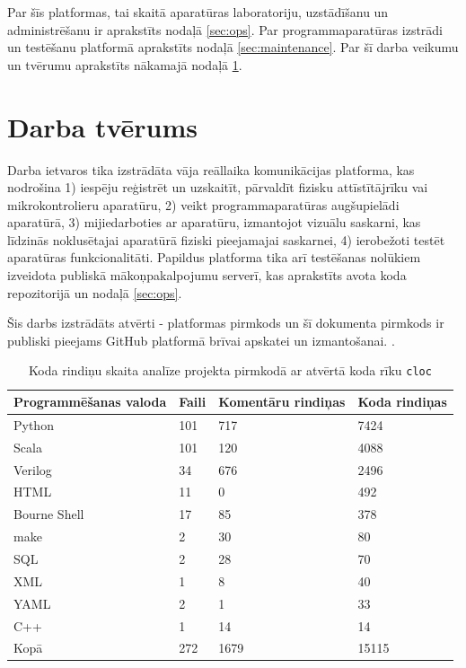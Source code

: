 Par šīs platformas, tai skaitā aparatūras laboratoriju, uzstādīšanu un
administrēšanu ir aprakstīts nodaļā \ref{sec:ops}. Par programmaparatūras
izstrādi un testēšanu platformā aprakstīts nodaļā \ref{sec:maintenance}. Par šī
darba veikumu un tvērumu aprakstīts nākamajā nodaļā \ref{sec:scope}.

\section{Darba tvērums}
\label{sec:scope}

Darba ietvaros tika izstrādāta vāja reāllaika komunikācijas platforma, kas
nodrošina 1) iespēju reģistrēt un uzskaitīt, pārvaldīt fizisku attīstītājrīku
vai mikrokontrolieru aparatūru, 2) veikt programmaparatūras augšupielādi
aparatūrā, 3) mijiedarboties ar aparatūru, izmantojot vizuālu saskarni, kas
līdzinās noklusētajai aparatūrā fiziski pieejamajai saskarnei, 4) ierobežoti
testēt aparatūras funkcionalitāti. Papildus platforma tika arī testēšanas
nolūkiem izveidota publiskā mākoņpakalpojumu serverī, kas aprakstīts avota koda
repozitorijā un nodaļā \ref{sec:ops}. \cite{VeinbahsKrisjanisTestbed}
\cite{VeinbahsKrisjanisProduction}

Šis darbs izstrādāts atvērti - platformas pirmkods un šī dokumenta pirmkods ir
publiski pieejams GitHub platformā brīvai apskatei un izmantošanai.
\cite{VeinbahsKrisjanisTestbed} \cite{VeinbahsKrisjanisThesis}.

\begin{table}[H]
    \begin{tabular}{ |p{3cm}|p{3cm}|p{3cm}|p{3cm}| }
    \hline
    Programmēšanas valoda & Faili & Komentāru rindiņas & Koda rindiņas \\
    \hline
    Python          & 101   & 717   & 7424  \\
    Scala           & 101   & 120   & 4088  \\
    Verilog         & 34    & 676   & 2496  \\
    HTML            & 11    & 0     & 492   \\
    Bourne Shell    & 17    & 85    & 378   \\
    make            & 2     & 30    & 80    \\
    SQL             & 2     & 28    & 70    \\
    XML             & 1     & 8     & 40    \\
    YAML            & 2     & 1     & 33    \\
    C++             & 1     & 14    & 14    \\
    \hhline{|=|=|=|=|}
    Kopā & 272 & 1679 & 15115\\
    \hline
    \end{tabular}
    \centering
    \captionsetup{justification=centering}
    \caption{Koda rindiņu skaita analīze projekta pirmkodā ar atvērtā koda rīku \lstinline!cloc!}
    \label{table:cloc}
\end{table}

